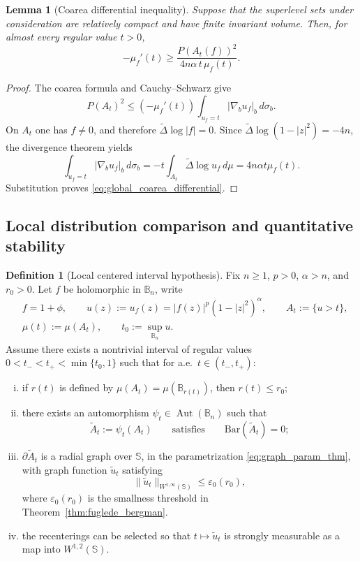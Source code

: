\documentclass[11pt]{amsart}
\theoremstyle{plain}
\newtheorem{lemma}[theorem]{Lemma}
\theoremstyle{definition}
\newtheorem{definition}[theorem]{Definition}
\theoremstyle{remark}
\newcommand{\B}{\mathbb{B}}
\newcommand{\Sph}{\mathbb{S}}
\DeclareMathOperator{\Aut}{Aut}
\begin{document}
\begin{lemma}[Coarea differential inequality]\label{lem:coarea_differential}
Suppose that the superlevel sets under consideration are relatively compact
and have finite invariant volume. Then, for almost every regular value $t>0$,
\begin{equation}\label{eq:global_coarea_differential}
 -\mu_f'(t)\ge
 \frac{P(A_t(f))^2}{4n\alpha\,t\,\mu_f(t)}.
\end{equation}
\end{lemma}

\begin{proof}
The coarea formula and Cauchy--Schwarz give
\[
 P(A_t)^2\le(-\mu_f'(t))
 \int_{u_f=t}|\nabla_bu_f|_b\,d\sigma_b.
\]
On $A_t$ one has $f\ne0$, and therefore
$\widetilde\Delta\log|f|=0$. Since
$\widetilde\Delta\log(1-|z|^2)=-4n$, the divergence theorem yields
\[
 \int_{u_f=t}|\nabla_bu_f|_b\,d\sigma_b
 =-t\int_{A_t}\widetilde\Delta\log u_f\,d\mu
 =4n\alpha t\mu_f(t).
\]
Substitution proves \eqref{eq:global_coarea_differential}.
\end{proof}

\subsection{Local distribution comparison and quantitative stability}
\label{sec:local_main}

\begin{definition}[Local centered interval hypothesis]\label{Setup}
Fix \(n\ge 1\), \(p>0\), \(\alpha>n\), and \(r_0>0\). Let \(f\) be holomorphic in \(\B_n\), write
\begin{align*}
   &f=1+\phi,\qquad u(z):=u_f(z)=|f(z)|^p(1-|z|^2)^\alpha,\qquad A_t:=\{u>t\},\\
   & \mu(t):=\mu(A_t),\qquad t_0:=\sup_{\B_n}u.
\end{align*}
Assume there exists a nontrivial interval of regular values
$0<t_-<t_+<\min\{t_0,1\}$ such that for a.e.\
\(t\in(t_-,t_+)\):
\begin{enumerate}[(i)]
\item if \(r(t)\) is defined by \(\mu(A_t)=\mu(\B_{r(t)})\), then \(r(t)\le r_0\);
\item there exists an automorphism \(\psi_t\in\Aut(\B_n)\) such that
\[
\widetilde A_t:=\psi_t(A_t)
\qquad\text{satisfies}\qquad
\mathrm{Bar}(\widetilde A_t)=0;
\]
\item \(\partial \widetilde A_t\) is a radial graph over \(\Sph\), in the parametrization
\eqref{eq:graph_param_thm}, with graph function \(\widetilde u_t\) satisfying
\[
\|\widetilde u_t\|_{W^{1,\infty}(\Sph)}\le \varepsilon_0(r_0),
\]
where \(\varepsilon_0(r_0)\) is the smallness threshold in
Theorem~\ref{thm:fuglede_bergman}.
\item the recenterings can be selected so that
$t\mapsto\widetilde u_t$ is strongly measurable as a map into
$W^{1,2}(\Sph)$.
\end{enumerate}
\end{definition}
\end{document}
